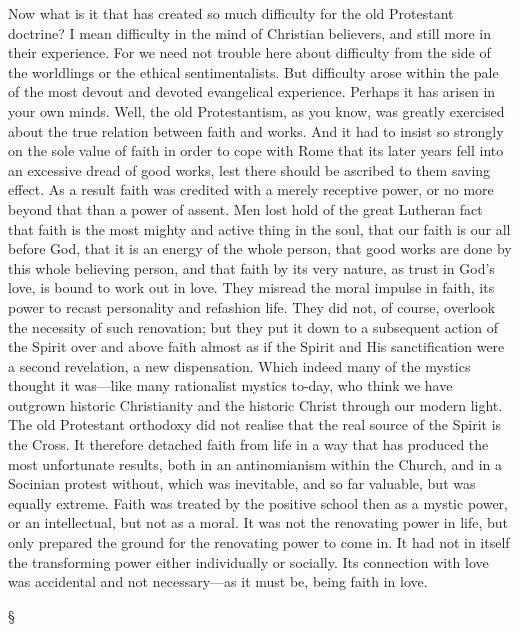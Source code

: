 \documentclass[12pt,a5paper,twoside,titlepage]{book}
\begin{document}
Now what is it that has created so much difficulty 
for the old Protestant doctrine? I mean 
difficulty in the mind of Christian believers, and 
still more in their experience. For we need not 
trouble here about difficulty from the side of the 
worldlings or the ethical sentimentalists. But 
difficulty arose within the pale of the most 
devout and devoted evangelical experience. 
Perhaps it has arisen in your own minds. Well, 
the old Protestantism, as you know, was greatly 
exercised about the true relation between faith 
and works. And it had to insist so strongly on 
the sole value of faith in order to cope with 
Rome that its later years fell into an excessive 
dread of good works, lest there should be 
ascribed to them saving effect. As a result faith 
was credited with a merely receptive power, or 
no more beyond that than a power of assent. 
Men lost hold of the great Lutheran fact that 
faith is the most mighty and active thing in the 
soul, that our faith is our all before God, that it 
is an energy of the whole person, that good 
works are done by this whole believing person, 
and that faith by its very nature, as trust in God's 
love, is bound to work out in love. They misread 
the moral impulse in faith, its power to 
recast personality and refashion life. They did 
not, of course, overlook the necessity of such 
renovation; but they put it down to a subsequent 
action of the Spirit over and above faith 
almost as if the Spirit and His sanctification were 
a second revelation, a new dispensation. Which 
indeed many of the mystics thought it was---like 
many rationalist mystics to-day, who think we 
have outgrown historic Christianity and the 
historic Christ through our modern light. The 
old Protestant orthodoxy did not realise that the 
real source of the Spirit is the Cross. It therefore 
detached faith from life in a way that has produced 
the most unfortunate results, both in an 
antinomianism within the Church, and in a 
Socinian protest without, which was inevitable, 
and so far valuable, but was equally extreme. 
Faith was treated by the positive school then as a 
mystic power, or an intellectual, but not as a 
moral. It was not the renovating power in life, 
but only prepared the ground for the renovating 
power to come in. It had not in itself the transforming 
power either individually or socially. 
Its connection with love was accidental and not 
necessary---as it must be, being faith in love. 

\begin{center}
\S
\end{center}
\end{document}
